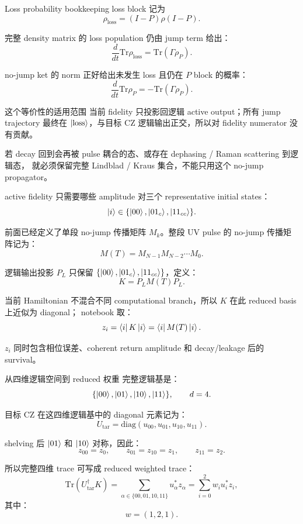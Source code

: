 \documentclass[aspectratio=169,11pt]{ctexbeamer}
\newcommand{\ketloss}{\ket{\mathrm{loss}}}
\begin{document}
\begin{frame}{Loss probability bookkeeping}
  loss block 记为
  \[
  \rho_{\mathrm{loss}}=(I-P)\rho(I-P).
  \]

  完整 density matrix 的 loss population 仍由 jump term 给出：
  \[
  \frac{d}{dt}\mathrm{Tr}\rho_{\mathrm{loss}}
  =
  \mathrm{Tr}(\Gamma\rho_P).
  \]

  no-jump ket 的 norm 正好给出未发生 loss 且仍在 \(P\) block 的概率：
  \[
  \frac{d}{dt}\mathrm{Tr}\rho_P
  =
  -\mathrm{Tr}(\Gamma\rho_P).
  \]
\end{frame}

\begin{frame}{这个等价性的适用范围}
  当前 fidelity 只投影回逻辑 active output；所有 jump trajectory 最终在
  \(\ketloss\)，与目标 CZ 逻辑输出正交，所以对 fidelity numerator 没有贡献。

  若 decay 回到会再被 pulse 耦合的态、或存在 dephasing / Raman scattering 到逻辑态，
  就必须保留完整 Lindblad / Kraus 集合，不能只用这个 no-jump propagator。
\end{frame}

\begin{frame}{active fidelity 只需要哪些 amplitude}
  对三个 representative initial states：
  \[
  \ket{i}\in
  \{\ket{00},\ket{01_c},\ket{11_{cc}}\}.
  \]

  前面已经定义了单段 no-jump 传播矩阵 \(M_k\)。整段 UV pulse 的 no-jump
  传播矩阵记为：
  \[
  M(T)=M_{N-1}M_{N-2}\cdots M_0.
  \]

  逻辑输出投影 \(P_L\) 只保留
  \(\{\ket{00},\ket{01_c},\ket{11_{cc}}\}\)，定义：
  \[
  K=P_LM(T)P_L.
  \]

  当前 Hamiltonian 不混合不同 computational branch，所以 \(K\) 在此 reduced basis 上近似为 diagonal；
  notebook 取：
  \[
  z_i=\bra{i}K\ket{i}
  =
  \bra{i}M(T)\ket{i}.
  \]

  \(z_i\) 同时包含相位误差、coherent return amplitude 和 decay/leakage 后的 survival。
\end{frame}

\begin{frame}{从四维逻辑空间到 reduced 权重}
  完整逻辑基是：
  \[
  \{\ket{00},\ket{01},\ket{10},\ket{11}\},
  \qquad d=4.
  \]

  目标 CZ 在这四维逻辑基中的 diagonal 元素记为：
  \[
  U_{\mathrm{tar}}=\mathrm{diag}(u_{00},u_{01},u_{10},u_{11}).
  \]

  shelving 后 \(\ket{01}\) 和 \(\ket{10}\) 对称，因此：
  \[
  z_{00}=z_0,\qquad
  z_{01}=z_{10}=z_1,\qquad
  z_{11}=z_2.
  \]

  所以完整四维 trace 可写成 reduced weighted trace：
  \[
  \mathrm{Tr}(U_{\mathrm{tar}}^\dagger K)
  =
  \sum_{\alpha\in\{00,01,10,11\}}
  u_\alpha^* z_\alpha
  =
  \sum_{i=0}^{2} w_i u_i^* z_i,
  \]
  其中：
  \[
  w=(1,2,1).
  \]
\end{frame}
\end{document}
